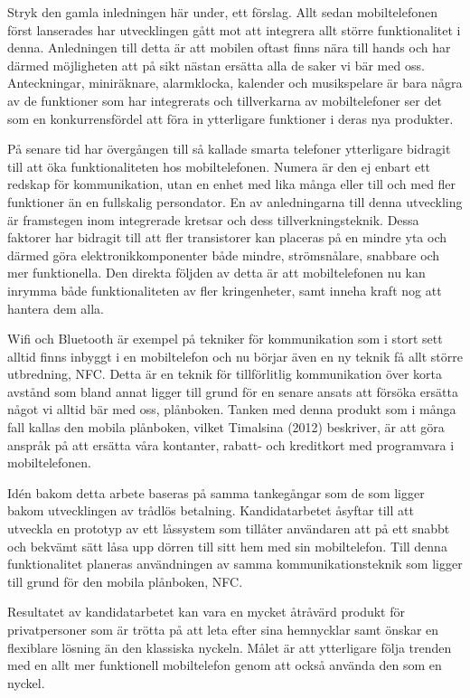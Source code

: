 \documentclass[11pt]{article}
\begin{document}
Stryk den gamla inledningen här under, ett förslag. Allt sedan mobiltelefonen först lanserades har utvecklingen gått mot att integrera allt större funktionalitet i denna. Anledningen till detta är att mobilen oftast finns nära till hands och har därmed möjligheten att på sikt nästan ersätta alla de saker vi bär med oss. Anteckningar, miniräknare, alarmklocka, kalender och musikspelare är bara några av de funktioner som har integrerats och tillverkarna av mobiltelefoner ser det som en konkurrensfördel att föra in ytterligare funktioner i deras nya produkter.

På senare tid har övergången till så kallade smarta telefoner ytterligare bidragit till att öka funktionaliteten hos mobiltelefonen. Numera är den ej enbart ett redskap för kommunikation, utan en enhet med lika många eller till och med fler funktioner än en fullskalig persondator. En av anledningarna till denna utveckling är framstegen inom integrerade kretsar och dess tillverkningsteknik. Dessa faktorer har bidragit till att fler transistorer kan placeras på en mindre yta och därmed göra elektronikkomponenter både mindre, strömsnålare, snabbare och mer funktionella. Den direkta följden av detta är att mobiltelefonen nu kan inrymma både funktionaliteten av fler kringenheter, samt inneha kraft nog att hantera dem alla.

Wifi och Bluetooth är exempel på tekniker för kommunikation som i stort sett alltid finns inbyggt i en mobiltelefon och nu börjar även en ny teknik få allt större utbredning, NFC. Detta är en teknik för tillförlitlig kommunikation över korta avstånd som bland annat ligger till grund för en senare ansats att försöka ersätta något vi alltid bär med oss, plånboken. Tanken med denna produkt som i många fall kallas den mobila plånboken, vilket Timalsina (2012) beskriver, är att göra anspråk på att ersätta våra kontanter, rabatt- och kreditkort med programvara i mobiltelefonen.

Idén bakom detta arbete baseras på samma tankegångar som de som ligger bakom utvecklingen av trådlös betalning. Kandidatarbetet åsyftar till att utveckla en prototyp av ett låssystem som tillåter användaren att på ett snabbt och bekvämt sätt låsa upp dörren till sitt hem med sin mobiltelefon. Till denna funktionalitet planeras användningen av samma kommunikationsteknik som ligger till grund för den mobila plånboken, NFC.

Resultatet av kandidatarbetet kan vara en mycket åtråvärd produkt för privatpersoner som är trötta på att leta efter sina hemnycklar samt önskar en flexiblare lösning än den klassiska nyckeln. Målet är att ytterligare följa trenden med en allt mer funktionell mobiltelefon genom att också använda den som en nyckel.
\end{document}
